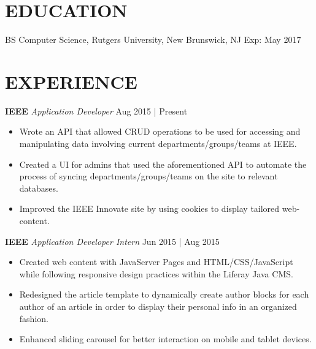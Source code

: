 \documentclass[line,margin]{res}
\begin{document}
    \address{Metuchen, NJ 08840 | (732)-476-8719 | saad@saadquadri.com}

    \begin{resume}

      \vspace{-4mm}

      \section{EDUCATION}
          BS Computer Science, Rutgers University, New Brunswick, NJ \hfill Exp: May 2017

      \section{EXPERIENCE}
          {\textbf{IEEE} \sl  Application Developer} \hfill  Aug 2015 | Present
          \vspace{1.75mm}
          \begin{itemize} \itemsep 3pt
              \item Wrote an API that allowed CRUD operations to be used for accessing and manipulating data involving current departments/groups/teams at IEEE.
              \item Created a UI for admins that used the aforementioned API to automate the process of syncing departments/groups/teams on the site to relevant databases.
              \item Improved the IEEE Innovate site by using cookies to display tailored web-content.
          \end{itemize}

          {\textbf{IEEE} \sl  Application Developer Intern} \hfill  Jun 2015 | Aug 2015
          \vspace{1.75mm}
          \begin{itemize} \itemsep 3pt
              \item Created web content with JavaServer Pages and HTML/CSS/JavaScript while following responsive design practices within the Liferay Java CMS.
              \item Redesigned the article template to dynamically create author blocks for each author of an article in order to display their personal info in an organized fashion.
              \item Enhanced sliding carousel for better interaction on mobile and tablet devices.
          \end{itemize}


\end{resume}
\end{document}
